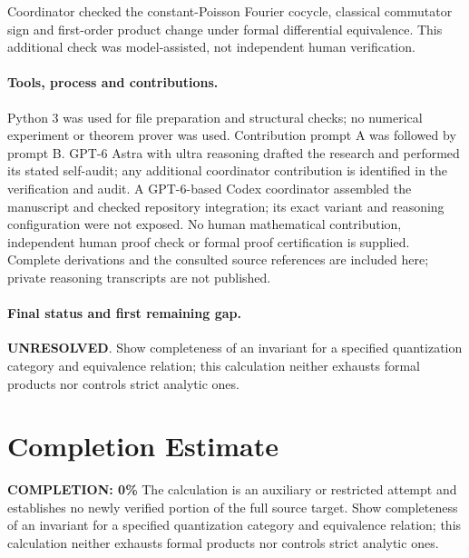 \documentclass[11pt]{article}
\begin{document}
Coordinator checked the constant-Poisson Fourier cocycle, classical commutator sign and first-order product change under formal differential equivalence. This additional check was model-assisted, not independent human verification.

\paragraph{Tools, process and contributions.}
Python 3 was used for file preparation and structural checks; no numerical experiment or theorem prover was used. Contribution prompt A was followed by prompt B. GPT-6 Astra with ultra reasoning drafted the research and performed its stated self-audit; any additional coordinator contribution is identified in the verification and audit. A GPT-6-based Codex coordinator assembled the manuscript and checked repository integration; its exact variant and reasoning configuration were not exposed. No human mathematical contribution, independent human proof check or formal proof certification is supplied. Complete derivations and the consulted source references are included here; private reasoning transcripts are not published.

\paragraph{Final status and first remaining gap.}
\textbf{UNRESOLVED}. Show completeness of an invariant for a specified quantization category and equivalence relation; this calculation neither exhausts formal products nor controls strict analytic ones.

\section{Completion Estimate}
\noindent\textbf{COMPLETION: 0\%}
The calculation is an auxiliary or restricted attempt and establishes no newly verified portion of the full source target. Show completeness of an invariant for a specified quantization category and equivalence relation; this calculation neither exhausts formal products nor controls strict analytic ones.
\end{document}
